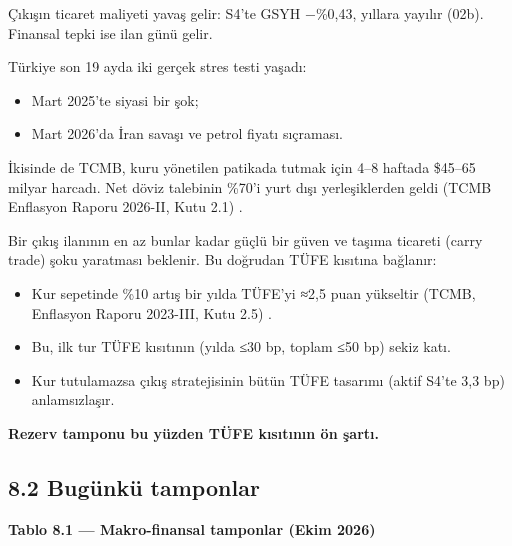 Çıkışın ticaret maliyeti yavaş gelir: S4'te GSYH −\%0,43, yıllara yayılır (02b). Finansal tepki ise ilan günü gelir.

Türkiye son 19 ayda iki gerçek stres testi yaşadı:

\begin{itemize}
\tightlist
\item
  Mart 2025'te siyasi bir şok;
\item
  Mart 2026'da İran savaşı ve petrol fiyatı sıçraması.
\end{itemize}

İkisinde de TCMB, kuru yönetilen patikada tutmak için 4--8 haftada \$45--65 milyar harcadı. Net döviz talebinin \%70'i yurt dışı yerleşiklerden geldi (TCMB Enflasyon Raporu 2026-II, Kutu 2.1) \etiketV{}.

Bir çıkış ilanının en az bunlar kadar güçlü bir güven ve taşıma ticareti (carry trade) şoku yaratması beklenir. Bu doğrudan TÜFE kısıtına bağlanır:

\begin{itemize}
\tightlist
\item
  Kur sepetinde \%10 artış bir yılda TÜFE'yi ≈2,5 puan yükseltir (TCMB, Enflasyon Raporu 2023-III, Kutu 2.5) \etiketV{}.
\item
  Bu, ilk tur TÜFE kısıtının (yılda ≤30 bp, toplam ≤50 bp) sekiz katı.
\item
  Kur tutulamazsa çıkış stratejisinin bütün TÜFE tasarımı (aktif S4'te 3,3 bp) anlamsızlaşır.
\end{itemize}

\textbf{Rezerv tamponu bu yüzden TÜFE kısıtının ön şartı.}

\hypertarget{02c_hazirlik-82-buguxfcnkuxfc-tamponlar}{%
\subsection{8.2 Bugünkü tamponlar}\label{02c_hazirlik-82-buguxfcnkuxfc-tamponlar}}


\textbf{Tablo 8.1 --- Makro-finansal tamponlar (Ekim 2026)}

\nopagebreak[4]

\begingroup\gbtablo\small


